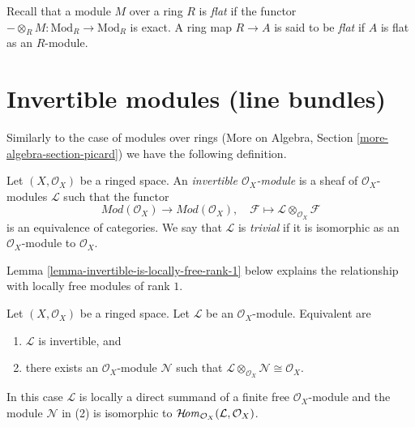 \medskip\noindent
Recall that a module $M$ over a ring $R$ is {\it flat} if the functor
$-\otimes_R M : \text{Mod}_R \to \text{Mod}_R$ is exact. A ring map
$R \to A$ is said to be {\it flat} if $A$ is flat as an $R$-module.

\section{Invertible modules (line bundles)}
\label{section-invertible}

\noindent
Similarly to the case of modules over rings
(More on Algebra, Section \ref{more-algebra-section-picard})
we have the following definition.

\begin{definition}
\label{definition-invertible}
Let $(X, \mathcal{O}_X)$ be a ringed space. An
{\it invertible $\mathcal{O}_X$-module} is a sheaf
of $\mathcal{O}_X$-modules $\mathcal{L}$ such that
the functor
$$
\textit{Mod}(\mathcal{O}_X) \longrightarrow \textit{Mod}(\mathcal{O}_X),\quad
\mathcal{F} \longmapsto \mathcal{L} \otimes_{\mathcal{O}_X} \mathcal{F}
$$
is an equivalence of categories. We say that $\mathcal{L}$ is
{\it trivial} if it is isomorphic as an $\mathcal{O}_X$-module
to $\mathcal{O}_X$.
\end{definition}

\noindent
Lemma \ref{lemma-invertible-is-locally-free-rank-1}
below explains the relationship with locally free modules
of rank $1$.

\begin{lemma}
\label{lemma-invertible}
Let $(X, \mathcal{O}_X)$ be a ringed space. Let $\mathcal{L}$
be an $\mathcal{O}_X$-module. Equivalent are
\begin{enumerate}
\item $\mathcal{L}$ is invertible, and
\item there exists an $\mathcal{O}_X$-module $\mathcal{N}$
such that
$\mathcal{L} \otimes_{\mathcal{O}_X} \mathcal{N} \cong \mathcal{O}_X$.
\end{enumerate}
In this case $\mathcal{L}$ is locally a direct summand of a finite free
$\mathcal{O}_X$-module and the module $\mathcal{N}$ in (2) is isomorphic to
$\mathop{\mathcal{H}\!\mathit{om}}\nolimits_{\mathcal{O}_X}(\mathcal{L}, \mathcal{O}_X)$.
\end{lemma}


